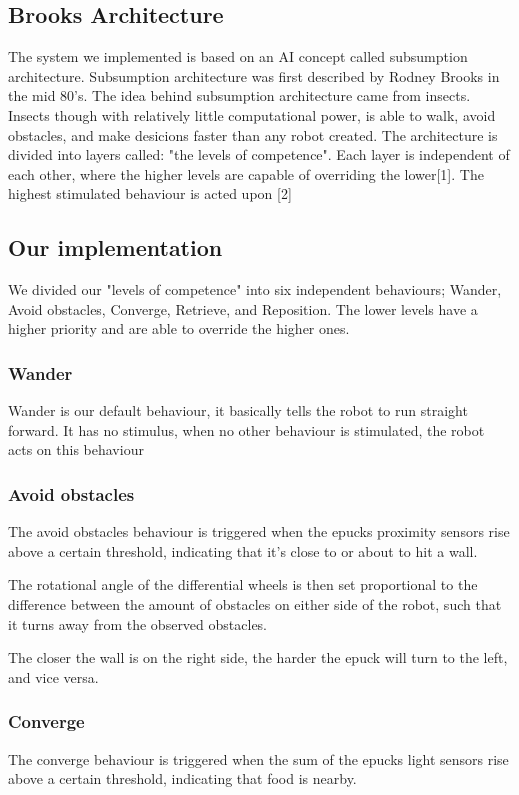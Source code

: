 \documentclass{article}
\begin{document}
\subsection{Brooks Architecture}
The system we implemented is based on an AI concept called subsumption architecture. Subsumption architecture was first described by Rodney Brooks in the mid 80's. The idea behind subsumption architecture came from insects. Insects though with relatively little computational power, is able to walk, avoid obstacles, and make desicions faster than any robot created. The architecture is divided into layers called: "the levels of competence". Each layer is  independent of each other, where the higher levels are capable of overriding the lower[1]. The highest stimulated behaviour is acted upon [2]

\subsection{Our implementation}
We divided our "levels of competence" into six independent behaviours; Wander, Avoid obstacles, Converge, Retrieve, and Reposition. The lower levels have a higher priority and are able to override the higher ones.


\subsubsection{Wander}
Wander is our default behaviour, it basically tells the robot to run straight forward. It has no stimulus, when no other behaviour is stimulated, the robot acts on this behaviour

\subsubsection{Avoid obstacles}
The avoid obstacles behaviour is triggered when the epucks proximity sensors rise above a certain threshold, indicating that it's close to or about to hit a wall.

The rotational angle of the differential wheels is then set proportional to the difference between the amount of obstacles on either side of the robot, such that it turns away from the observed obstacles. 

The closer the wall is on the right side, the harder the epuck will turn to the left, and vice versa. 

\subsubsection{Converge}
The converge behaviour is triggered when the sum of the epucks light sensors rise above a certain threshold, indicating that food is nearby.
\end{document}
